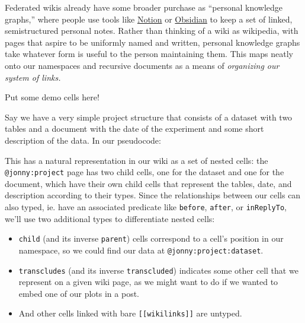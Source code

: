 Federated wikis already have some broader purchase as ``personal
knowledge graphs,'' \citep{balogPersonalKnowledgeGraphs2019} 
where people use tools like \href{https://www.notion.so/}{Notion} or
\href{https://obsidian.md/}{Obsidian} to keep a set of linked,
semistructured personal notes. Rather than thinking of a wiki as
wikipedia, with pages that aspire to be uniformly named and written,
personal knowledge graphs take whatever form is useful to the person
maintaining them. This maps neatly onto our namespaces and recursive
documents as a means of \emph{organizing our system of links.}

Put some demo cells here!

Say we have a very simple project structure that consists of a dataset
with two tables and a document with the date of the experiment and some
short description of the data. In our pseudocode:

\begin{Shaded}
\begin{Highlighting}[]



\end{Highlighting}
\end{Shaded}

This has a natural representation in our wiki as a set of nested cells:
the \texttt{@jonny:project} page has two child cells, one for the
dataset and one for the document, which have their own child cells that
represent the tables, date, and description according to their types.
Since the relationships between our cells can also typed, ie. have an
associated predicate like \texttt{before}, \texttt{after}, or
\texttt{inReplyTo}, we'll use two additional types to differentiate
nested cells:

\begin{itemize}
\tightlist
\item
  \texttt{child} (and its inverse \texttt{parent}) cells correspond to a
  cell's position in our namespace, so we could find our data at
  \texttt{@jonny:project:dataset}.
\item
  \texttt{transcludes} (and its inverse \texttt{transcluded}) indicates
  some other cell that we represent on a given wiki page, as we might
  want to do if we wanted to embed one of our plots in a post.
\item
  And other cells linked with bare \texttt{{[}{[}wikilinks{]}{]}} are
  untyped.
\end{itemize}

